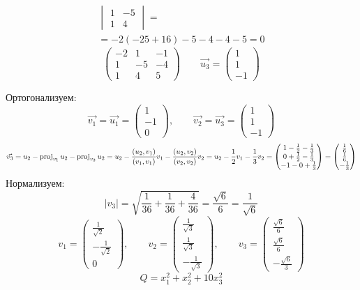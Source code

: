 \begin{itemize}
\begin{multline*}
\begin{vmatrix}
            1 & -5 \\
            1 & 4
        \end{vmatrix} = \\
        = -2(-25 + 16) - 5 - 4 - 4 - 5 = 0
    \end{multline*}
    $$
    \begin{pmatrix}
    	-2 & 1 & -1 \\
        1 & -5 & -4 \\
        1 & 4 & 5
    \end{pmatrix} \qquad \vec{u_3} =
    \begin{pmatrix}
    	1 \\
        1 \\
        -1
    \end{pmatrix} $$
\end{itemize}
Ортогонализуем:
$$ \vec{v_1} = \vec{u_1} =
\begin{pmatrix}
    1 \\
    -1 \\
    0
\end{pmatrix}, \qquad \vec{v_2} = \vec{u_3} =
\begin{pmatrix}
    1 \\
    1 \\
    -1
\end{pmatrix} $$
$$ \vec{v_3} = u_2 - \operatorname{proj}_{v_1}u_2 - \operatorname{proj}_{v_2}u_2 = u_2 - \frac{(u_2, v_1)}{(v_1, v_1)}v_1 - \frac{(u_2, v_2)}{(v_2, v_2)}v_2 = u_2 - \frac12v_1 - \frac13v_2 =
\begin{pmatrix}
	1 - \frac{1}2 - \frac13 \\
    0 + \frac{1}2 - \frac13 \\
    -1 - 0 + \frac13
\end{pmatrix} =
\begin{pmatrix}
	\frac16 \\
    \frac16 \\
    -\frac13
\end{pmatrix} $$
Нормализуем:
$$ |v_3| = \sqrt{\frac1{36} + \frac1{36} + \frac4{36}} = \frac{\sqrt{6}}6 = \frac1{\sqrt6} $$
$$ v_1 =
\begin{pmatrix}
    \frac1{\sqrt2} \\
    -\frac1{\sqrt2} \\
    0
\end{pmatrix}, \qquad v_2 =
\begin{pmatrix}
    \frac1{\sqrt3} \\
    \frac1{\sqrt3} \\
    -\frac1{\sqrt3}
\end{pmatrix}, \qquad v_3 =
\begin{pmatrix}
    \frac{\sqrt6}6 \\
    \frac{\sqrt6}6 \\
    -\frac{\sqrt6}3
\end{pmatrix} $$
$$ Q = x_1^2 + x_2^2 + 10x_3^2 $$

